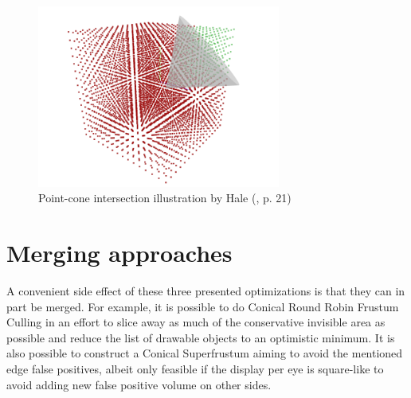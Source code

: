 \begin{figure}[htb]
  \centering
  \includegraphics[height=6cm]{pictures/hale_cone}
  \caption{Point-cone intersection illustration by Hale (\cite{Hale.2018}, p. 21)} \label{fig:hale_cone}
\end{figure}

\section{Merging approaches}
A convenient side effect of these three presented optimizations is that they can in part be merged. For example, it is possible to do Conical Round Robin Frustum Culling in an effort to slice away as much of the conservative invisible area as possible and reduce the list of drawable objects to an optimistic minimum. It is also possible to construct a Conical Superfrustum aiming to avoid the mentioned edge false positives, albeit only feasible if the display per eye is square-like to avoid adding new false positive volume on other sides.
